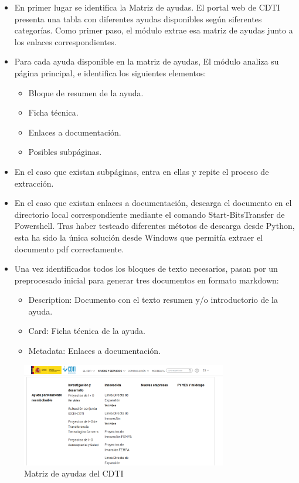 \begin{itemize}
    \item En primer lugar se identifica la Matriz de ayudas. El portal web de CDTI presenta una tabla con diferentes ayudas disponibles según siferentes categorías. Como primer paso, el módulo extrae esa matriz de ayudas junto a los enlaces correspondientes.
    \item Para cada ayuda disponible en la matriz de ayudas, El módulo analiza su página principal, e identifica los siguientes elementos:
    \begin{itemize}
        \item Bloque de resumen de la ayuda.
        \item Ficha técnica.
        \item Enlaces a documentación.
        \item Posibles subpáginas.
    \end{itemize}
    \item En el caso que existan subpáginas, entra en ellas y repite el proceso de extracción.
    \item En el caso que existan enlaces a documentación, descarga el documento en el directorio local correspondiente mediante el comando Start-BitsTransfer de Powershell.
    Tras haber testeado diferentes métotos de descarga desde Python, esta ha sido la única solución desde Windows que permitía extraer el documento pdf correctamente. 
    \item Una vez identificados todos los bloques de texto necesarios, pasan por un preprocesado inicial para generar tres documentos en formato markdown:
    \begin{itemize}
        \item Description: Documento con el texto resumen y/o introductorio de la ayuda.
        \item Card: Ficha técnica de la ayuda.
        \item Metadata: Enlaces a documentación.
    \end{itemize}
\end{itemize}


\begin{figure}[h]
	\centering
	\includegraphics[width=0.8\textwidth]{figs/cdti_matrix.png}
	\caption{Matriz de ayudas del CDTI}
	\label{fig:context-anoni1}
\end{figure}


